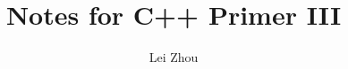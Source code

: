 \documentclass{article}
\begin{document}
\title{Notes for C++ Primer III}
\author{Lei Zhou}
\maketitle

%

%


\end{document}
